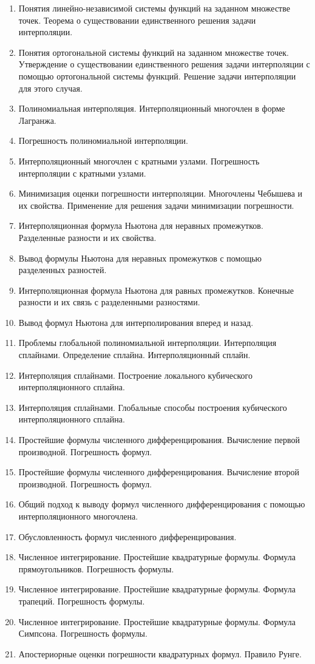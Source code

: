 \documentclass[14pt]{extarticle}
\begin{document}
\begin{enumerate}
    \item Понятия линейно-независимой системы функций на заданном множестве точек. Теорема о существовании единственного решения задачи интерполяции. 
    \item Понятия ортогональной системы функций на заданном множестве точек. Утверждение о существовании единственного решения задачи интерполяции с помощью ортогональной системы функций. Решение задачи интерполяции для этого случая. 
    \item Полиномиальная интерполяция. Интерполяционный многочлен в форме Лагранжа. 
    \item Погрешность полиномиальной интерполяции. 
    \item Интерполяционный многочлен с кратными узлами. Погрешность интерполяции с кратными узлами. 
    \item Минимизация оценки погрешности интерполяции. Многочлены Чебышева и их свойства. Применение для решения задачи минимизации погрешности. 
    \item Интерполяционная формула Ньютона для неравных промежутков. Разделенные разности и их свойства. 
    \item Вывод формулы Ньютона для неравных промежутков с помощью разделенных разностей.  
    \item Интерполяционная формула Ньютона для равных промежутков. Конечные разности и их связь с разделенными разностями. 
    \item Вывод формул Ньютона для интерполирования вперед и назад. 
    \item Проблемы глобальной полиномиальной интерполяции. Интерполяция сплайнами. Определение сплайна. Интерполяционный сплайн. 
    \item Интерполяция сплайнами. Построение локального кубического интерполяционного сплайна. 
    \item Интерполяция сплайнами. Глобальные способы построения кубического интерполяционного сплайна. 
    \item Простейшие формулы численного дифференцирования. Вычисление первой производной. Погрешность формул. 
    \item Простейшие формулы численного дифференцирования. Вычисление второй производной. Погрешность формул. 
    \item Общий подход к выводу формул численного дифференцирования с помощью интерполяционного многочлена. 
    \item Обусловленность формул численного дифференцирования. 
    \item Численное интегрирование. Простейшие квадратурные формулы. Формула прямоугольников. Погрешность формулы. 
    \item Численное интегрирование. Простейшие квадратурные формулы. Формула трапеций. Погрешность формулы. 
    \item Численное интегрирование. Простейшие квадратурные формулы. Формула Симпсона. Погрешность формулы. 
    \item Апостериорные оценки погрешности квадратурных формул. Правило Рунге.
\end{enumerate}
\end{document}
